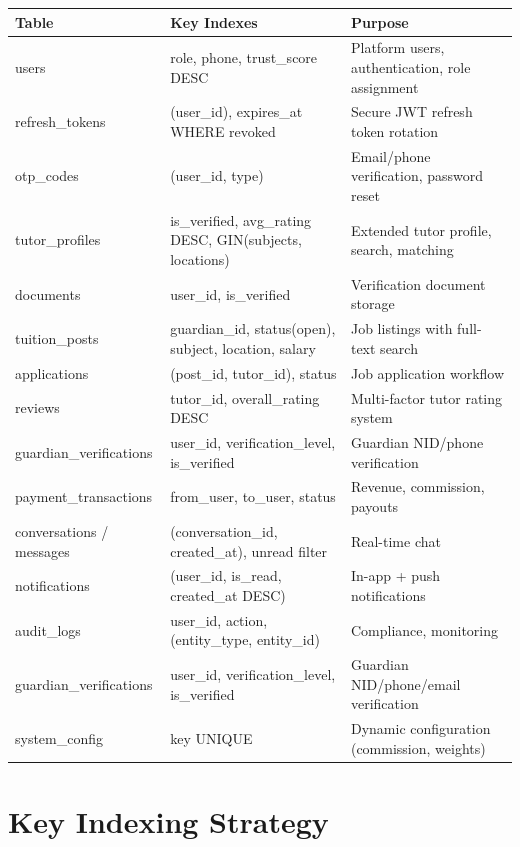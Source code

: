 \documentclass[12pt,a4paper,twoside]{report}
\begin{document}
\begin{longtable}{p{3.5cm}|p{3cm}|p{7cm}}
\toprule
\textbf{Table} & \textbf{Key Indexes} & \textbf{Purpose} \\
\midrule
\endhead
\bottomrule
\endfoot
users            & role, phone, trust\_score DESC & Platform users, authentication, role assignment \\
refresh\_tokens  & (user\_id), expires\_at WHERE revoked & Secure JWT refresh token rotation \\
otp\_codes       & (user\_id, type) & Email/phone verification, password reset \\
tutor\_profiles  & is\_verified, avg\_rating DESC, GIN(subjects, locations) & Extended tutor profile, search, matching \\
documents        & user\_id, is\_verified & Verification document storage \\
tuition\_posts   & guardian\_id, status(open), subject, location, salary & Job listings with full-text search \\
applications     & (post\_id, tutor\_id), status & Job application workflow \\
reviews          & tutor\_id, overall\_rating DESC & Multi-factor tutor rating system \\
guardian\_verifications & user\_id, verification\_level, is\_verified & Guardian NID/phone verification \\
payment\_transactions & from\_user, to\_user, status & Revenue, commission, payouts \\
conversations / messages & (conversation\_id, created\_at), unread filter & Real-time chat \\
notifications    & (user\_id, is\_read, created\_at DESC) & In-app + push notifications \\
audit\_logs      & user\_id, action, (entity\_type, entity\_id) & Compliance, monitoring \\
guardian\_verifications & user\_id, verification\_level, is\_verified & Guardian NID/phone/email verification \\
system\_config   & key UNIQUE & Dynamic configuration (commission, weights) \\
\bottomrule
\end{longtable}

\section{Key Indexing Strategy}
\end{document}
